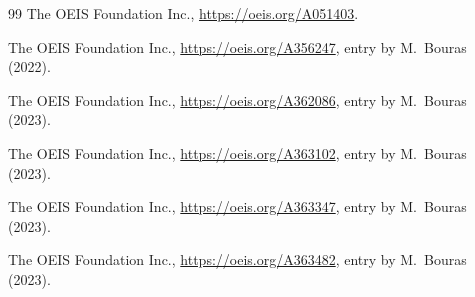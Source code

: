 \documentclass[11pt]{amsart}
\theoremstyle{plain}
\theoremstyle{definition}
\begin{document}
\begin{thebibliography}{99}
The OEIS Foundation Inc., \url{https://oeis.org/A051403}.

The OEIS Foundation Inc., \url{https://oeis.org/A356247}, entry by M.~Bouras (2022).

The OEIS Foundation Inc., \url{https://oeis.org/A362086}, entry by M.~Bouras (2023).

The OEIS Foundation Inc., \url{https://oeis.org/A363102}, entry by M.~Bouras (2023).

The OEIS Foundation Inc., \url{https://oeis.org/A363347}, entry by M.~Bouras (2023).

The OEIS Foundation Inc., \url{https://oeis.org/A363482}, entry by M.~Bouras (2023).

\end{thebibliography}
\end{document}
